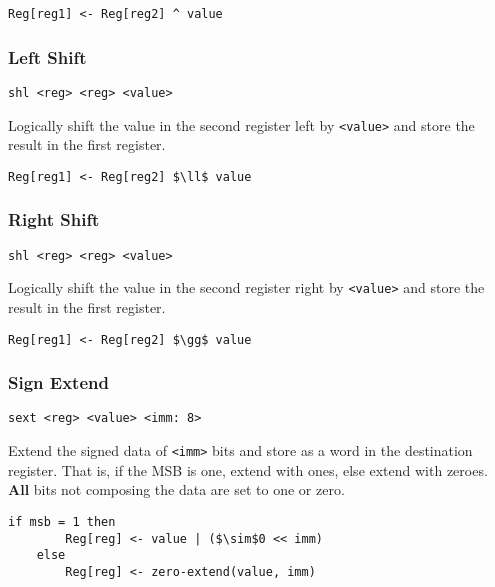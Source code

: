 \begin{lstlisting}[style=rtn,mathescape]
    Reg[reg1] <- Reg[reg2] ^ value
\end{lstlisting}

\subsubsection{Left Shift}

\begin{lstlisting}[style=assembly]
    shl <reg> <reg> <value>
\end{lstlisting}

Logically shift the value in the second register left by \texttt{<value>} and store the result in the first register.

\begin{lstlisting}[style=rtn,mathescape]
    Reg[reg1] <- Reg[reg2] $\ll$ value
\end{lstlisting}

\subsubsection{Right Shift}

\begin{lstlisting}[style=assembly]
    shl <reg> <reg> <value>
\end{lstlisting}

Logically shift the value in the second register right by \texttt{<value>} and store the result in the first register.

\begin{lstlisting}[style=rtn,mathescape]
    Reg[reg1] <- Reg[reg2] $\gg$ value
\end{lstlisting}

\subsubsection{Sign Extend}

\begin{lstlisting}[style=assembly]
    sext <reg> <value> <imm: 8>
\end{lstlisting}

Extend the signed data of \texttt{<imm>} bits and store as a word in the destination register.
That is, if the MSB is one, extend with ones, else extend with zeroes.
\textbf{All} bits not composing the data are set to one or zero.

\begin{lstlisting}[style=rtn,mathescape]
    if msb = 1 then
        Reg[reg] <- value | ($\sim$0 << imm)
    else
        Reg[reg] <- zero-extend(value, imm)
\end{lstlisting}

